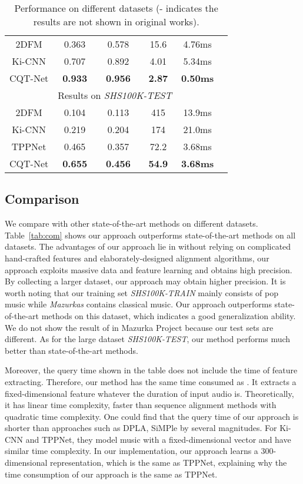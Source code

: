 \documentclass{article}
\newcommand{\tabref}[1]{\mbox{Table~\ref{#1}}}
\begin{document}
\begin{table}[H]
\begin{tabular}{cccccc}
      2DFM \cite{bertin2012large} & 0.363 & 0.578 & 15.6 & 4.76ms  \\
      Ki-CNN \cite{xu2018key}& 0.707 & 0.892 & 4.01 & 5.34ms \\ 
      CQT-Net & \textbf{0.933} & \textbf{0.956} & \textbf{2.87} & \textbf{0.50ms} \\
      \hline
      &\multicolumn{3}{c}{Results on \textit{SHS100K-TEST}} \\
      \hline
      2DFM \cite{bertin2012large} & 0.104 & 0.113 & 415 & 13.9ms  \\
      Ki-CNN \cite{xu2018key}& 0.219 & 0.204 & 174 & 21.0ms \\ 
      TPPNet \cite{yu2019temporal} & 0.465 & 0.357 & 72.2 & 3.68ms \\
      CQT-Net & \textbf{0.655} & \textbf{0.456} & \textbf{54.9} & \textbf{3.68ms} \\ 
      \bottomrule
  \end{tabular}
  \caption{Performance on different datasets (- indicates the results are not shown in original works).}
  \end{table}

\subsection{Comparison}
We compare with other state-of-the-art methods on different datasets. \tabref{tab:com} shows our approach outperforms state-of-the-art methods on all datasets. The advantages of our approach lie in without relying on complicated hand-crafted features and elaborately-designed alignment algorithms, our approach exploits massive data and feature learning and obtains high precision. By collecting a larger dataset, our approach may obtain higher precision. It is worth noting that our training set \textit{SHS100K-TRAIN} mainly consists of pop music while \textit{Mazurkas} contains classical music. Our approach outperforms state-of-the-art methods on this dataset, which indicates a good generalization ability. We do not show the result of \cite{grosche2012structure} in Mazurka Project because our test sets are different. As for the large dataset \textit{SHS100K-TEST}, our method performs much better than state-of-the-art methods.

Moreover, the query time shown in the table does not include the time of feature extracting. Therefore, our method has the same time consumed as \cite{yu2019temporal}. It extracts a fixed-dimensional feature whatever the duration of input audio is. Theoretically, it has linear time complexity, faster than sequence alignment methods with quadratic time complexity. One could find that the query time of our approach is shorter than approaches such as DPLA, SiMPle by several magnitudes. For Ki-CNN and TPPNet, they model music with a fixed-dimensional vector and have similar time complexity. In our implementation, our approach learns a $300$-dimensional representation, which is the same as TPPNet, explaining why the time consumption of our approach is the same as TPPNet.
\end{document}
